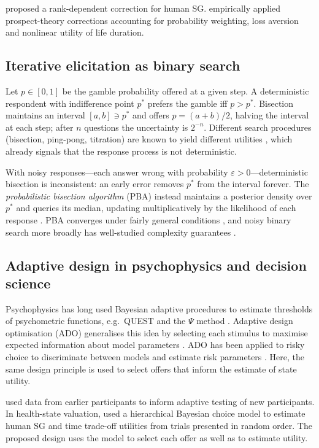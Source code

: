 \documentclass[11pt,a4paper]{article}
\begin{document}
\citet{wakker1995} proposed a rank-dependent correction for human SG. \citet{lipman2019} empirically applied prospect-theory corrections accounting for probability weighting, loss aversion and nonlinear utility of life duration.

\subsection{Iterative elicitation as binary search}

Let $p\in[0,1]$ be the gamble probability offered at a given step. A deterministic respondent with indifference point $p^\ast$ prefers the gamble iff $p>p^\ast$. Bisection maintains an interval $[a,b]\ni p^\ast$ and offers $p=(a+b)/2$, halving the interval at each step; after $n$ questions the uncertainty is $2^{-n}$. Different search procedures (bisection, ping-pong, titration) are known to yield different utilities \citep{lenert1998}, which already signals that the response process is not deterministic.

With noisy responses---each answer wrong with probability $\varepsilon>0$---deterministic bisection is inconsistent: an early error removes $p^\ast$ from the interval forever. The \emph{probabilistic bisection algorithm} (PBA) instead maintains a posterior density over $p^\ast$ and queries its median, updating multiplicatively by the likelihood of each response \citep{horstein1963,burnashev1974}. PBA converges under fairly general conditions \citep{waeber2013}, and noisy binary search more broadly has well-studied complexity guarantees \citep{karp2007}.

\subsection{Adaptive design in psychophysics and decision science}

Psychophysics has long used Bayesian adaptive procedures to estimate thresholds of psychometric functions, e.g.\ QUEST and the $\Psi$ method \citep{watson1983,kontsevich1999}. Adaptive design optimisation (ADO) generalises this idea by selecting each stimulus to maximise expected information about model parameters \citep{chaloner1995,myung2013}. ADO has been applied to risky choice to discriminate between models and estimate risk parameters \citep{cavagnaro2013,toubia2013}. Here, the same design principle is used to select offers that inform the estimate of state utility.

\citet{kim2014} used data from earlier participants to inform adaptive testing of new participants. In health-state valuation, \citet{lipmanpachur2025} used a hierarchical Bayesian choice model to estimate human SG and time trade-off utilities from trials presented in random order. The proposed design uses the model to select each offer as well as to estimate utility.
\end{document}
